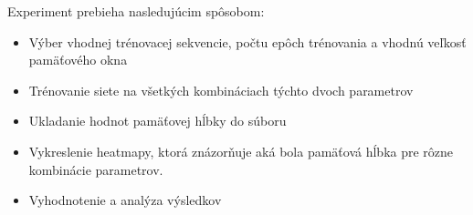 Experiment prebieha nasledujúcim spôsobom:
\begin{itemize}
    \item Výber vhodnej trénovacej sekvencie, počtu epôch trénovania a vhodnú veľkosť pamäťového okna
    \item Trénovanie siete na všetkých kombináciach týchto dvoch parametrov
    \item Ukladanie hodnot pamäťovej hĺbky do súboru
    \item Vykreslenie heatmapy, ktorá znázorňuje aká bola pamäťová hĺbka pre rôzne kombinácie parametrov.
    \item Vyhodnotenie a analýza výsledkov
\end{itemize}

%










